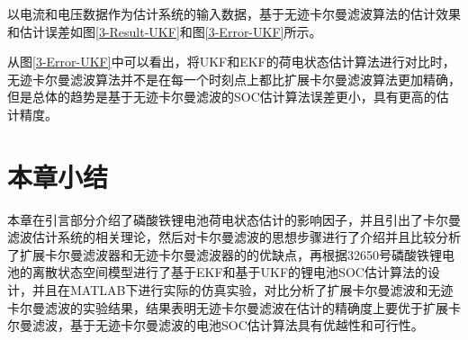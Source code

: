 以电流和电压数据作为估计系统的输入数据，基于无迹卡尔曼滤波算法的估计效果和估计误差如图\ref{3-Result-UKF}和图\ref{3-Error-UKF}所示。

从图\ref{3-Error-UKF}中可以看出，将UKF和EKF的荷电状态估计算法进行对比时，无迹卡尔曼滤波算法并不是在每一个时刻点上都比扩展卡尔曼滤波算法更加精确，但是总体的趋势是基于无迹卡尔曼滤波的SOC估计算法误差更小，具有更高的估计精度。
\section{本章小结}
本章在引言部分介绍了磷酸铁锂电池荷电状态估计的影响因子，并且引出了卡尔曼滤波估计系统的相关理论，然后对卡尔曼滤波的思想步骤进行了介绍并且比较分析了扩展卡尔曼滤波器和无迹卡尔曼滤波器的的优缺点，再根据32650号磷酸铁锂电池的离散状态空间模型进行了基于EKF和基于UKF的锂电池SOC估计算法的设计，并且在MATLAB下进行实际的仿真实验，对比分析了扩展卡尔曼滤波和无迹卡尔曼滤波的实验结果，结果表明无迹卡尔曼滤波在估计的精确度上要优于扩展卡尔曼滤波，基于无迹卡尔曼滤波的电池SOC估计算法具有优越性和可行性。
